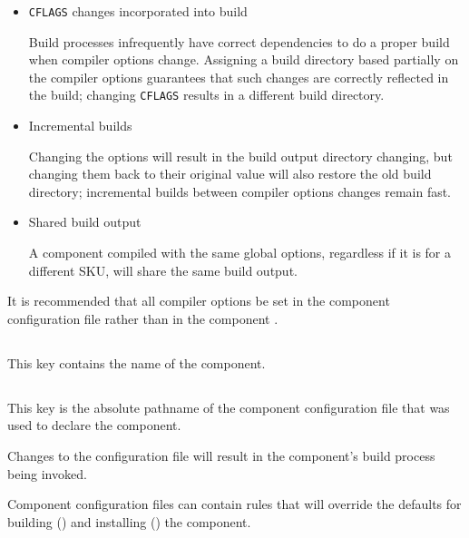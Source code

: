 \begin{itemize}
\item \texttt{CFLAGS} changes incorporated into build

  Build processes infrequently have correct dependencies to do a
  proper build when compiler options change.  Assigning a build
  directory based partially on the compiler options guarantees that
  such changes are correctly reflected in the build; changing
  \texttt{CFLAGS} results in a different build directory.

\item Incremental builds

  Changing the options will result in the build output directory
  changing, but changing them back to their original value will also
  restore the old build directory; incremental builds between compiler
  options changes remain fast.

\item Shared build output

  A component compiled with the same global options, regardless if it
  is for a different SKU, will share the same build output.
\end{itemize}

It is recommended that all compiler options be set in the component
configuration file rather than in the component \makefile.


\subsection{}\label{variables:component}

This key contains the name of the component.


\subsection{}\label{variables:configuration-file}

This key is the absolute pathname of the component configuration file
that was used to declare the component.

Changes to the configuration file will result in the component's build
process being invoked.

Component configuration files can contain \makefile rules that will
override the defaults for building
() and installing
() the component.

